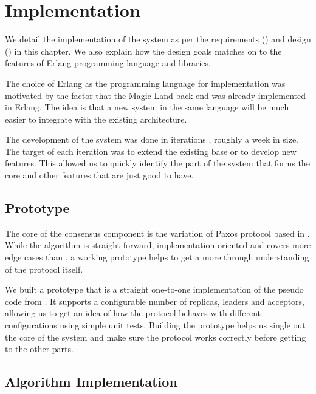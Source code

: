 \chapter{Implementation}
\label{chapter:implementation}

We detail the implementation of the system as per the requirements 
() and
design () in this chapter. We also explain how the
design goals matches on to the features of Erlang programming
language and  libraries.

The choice of Erlang as the programming language for implementation was
motivated by the factor that the Magic Land back end was already implemented in
Erlang. The idea is that a new system in the same language will be much easier
to integrate with the existing architecture.

The development of the system was done in iterations%
, roughly a week in size.
The target of each iteration was to extend the existing base or to develop
new features. This allowed us to quickly identify the part of the system that
forms the core and other features that are just good to have. 

\section{Prototype}

The core of the consensus component is the variation of Paxos protocol based
in \citet{Robbert2011}. While the algorithm is straight forward, implementation
oriented and covers more edge cases than \citet{Lamport01}, a working prototype
helps to get a more through understanding of the protocol itself.

We built a prototype that is a straight one-to-one implementation of the
pseudo code from \citet{Robbert2011}. It supports a configurable number of
replicas, leaders and acceptors, allowing us to get an idea of how the protocol
behaves with different configurations using simple unit tests. Building the
prototype helps us single out the core of the system and make sure the
protocol works correctly before getting to the other parts.

\section{Algorithm Implementation}

